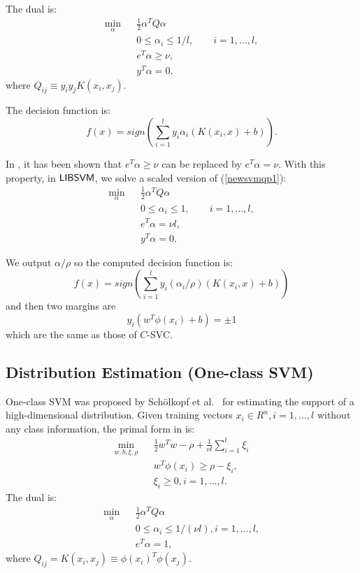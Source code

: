 \documentclass[11pt]{article}
\newcommand{\libsvm}{$\mbox{{\sf LIBSVM}}$}
\theoremstyle{break}
\begin{document}
The dual is:
\begin{eqnarray}
 \min_{\alpha} && \frac{1}{2}\alpha^T
Q\alpha  \nonumber  \\
 && 0 \leq \alpha_i \leq 1/l, \qquad i = 1, \ldots, l,   \label{newsvmqp1} \\
&& e^T \alpha \geq \nu,  \nonumber\\
&& y^T \alpha = 0.  \nonumber 
\end{eqnarray}
where 
$Q_{ij} \equiv y_i y_jK(x_i,x_j)$.

The decision function is:
\begin{equation*}
f(x) = 
sign(\sum_{i=1}^l 
y_i \alpha_i (K(x_i, x) + b)).
\end{equation*}

In , it has been 
shown that $e^T \alpha \geq \nu$
can be replaced by
$e^T \alpha = \nu$.
With this property,
in \libsvm, we solve a scaled version of 
(\ref{newsvmqp1}):
\begin{eqnarray}
\min_{\alpha} && \frac{1}{2}\alpha^T
Q\alpha  \nonumber  \\
 && 0 \leq \alpha_i \leq 1, \qquad i = 1, \ldots, l,    \nonumber \\
&& e^T \alpha = \nu l,  \nonumber \\
&& y^T \alpha = 0.  \nonumber
\end{eqnarray}

We output 
$\alpha/\rho$ so the
computed decision function is:
\begin{equation*}
f(x) = 
sign(\sum_{i=1}^l 
y_i (\alpha_i/\rho) (K(x_i, x) + b))
\end{equation*}
and then two margins are 
\begin{equation*}
 y_i (w^T \phi(x_i) + b) = \pm 1
\end{equation*}
which are the same as those of $C$-SVC.

\subsection{Distribution Estimation 
(One-class SVM)}

One-class SVM 
was  proposed 
by Sch\"{o}lkopf et al.~\citeyear{BS99b}
for 
estimating the support of 
a high-dimensional 
distribution. 
Given training vectors $x_i \in R^n, i = 1, 
\ldots,l$ without any class information, 
the primal form 
in  is:
\begin{eqnarray*}
\min_{w,b,\xi,\rho} && \frac{1}{2} w^T w - \rho
+ \frac{1}{\nu l} \sum_{i=1}^l \xi_i  \\
&& w^T \phi(x_i) \geq \rho - \xi_i, 
\nonumber \\
&& \xi_i \geq 0, i = 1, \ldots, l. 
 \nonumber 
\end{eqnarray*}
The dual is:
\begin{eqnarray}
 \min_{\alpha} && \frac{1}{2}\alpha^TQ\alpha  \nonumber  \\
&&0 \leq \alpha_i \leq 1/(\nu l), 
i = 1, \ldots, l,    \label{newsvmqp}\\
&&  e^T \alpha =1,  \nonumber
\end{eqnarray}
where 
$Q_{ij} =
K(x_i,x_j) \equiv \phi(x_i)^T
\phi(x_j)$.
 
\end{document}
